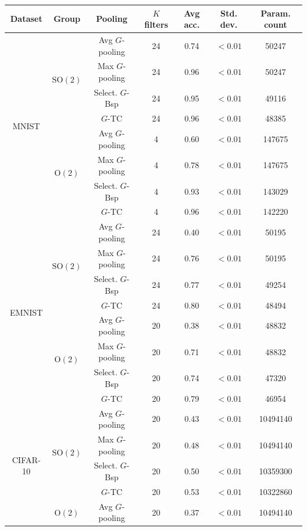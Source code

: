 \documentclass{article}
\theoremstyle{plain}
\theoremstyle{definition}
\theoremstyle{remark}
\begin{document}
\begin{table}[ht]
\centering
\begin{tabular}{||c|c|c|c|c|c|c||}
	\hline
	Dataset&Group&Pooling&$K$ filters&Avg acc.&Std. dev.&Param. count\\
 \hline
	\hline
	\multirow{8}{*}{MNIST}&\multirow{4}{*}{$\mathrm{SO}(2)$}&Avg $G$-pooling&24&0.74 &$<0.01$ &50247\\
	     &              &Max $G$-pooling&24& 0.96& $<0.01$ &50247\\
	     &              &Select. $G$-Bsp&24&0.95 &$<0.01$  &49116\\
	     &              &$G$-TC&24&0.96 &  $<0.01$&48385\\
        \cline{2-7}
	     &\multirow{4}{*}{$\mathrm{O}(2)$}&Avg $G$-pooling&4& 0.60&$<0.01$ &147675\\
	     &              &Max $G$-pooling&4&0.78 &  $<0.01$&147675\\
	     &              &Select. $G$-Bsp&4&0.93 & $<0.01$ &143029\\
	     &              &$G$-TC&4&0.96 &  $<0.01$&142220\\
	\hline
	\multirow{8}{*}{EMNIST}&\multirow{4}{*}{$\mathrm{SO}(2)$}&Avg $G$-pooling&24&0.40 &$<0.01$ &50195\\
	     &              &Max $G$-pooling&24& 0.76& $<0.01$ &50195\\
	     &              &Select. $G$-Bsp&24&0.77 & $<0.01$ &49254\\
	     &              &$G$-TC&24&0.80 &  $<0.01$&48494\\
	\cline{2-7}
	     &\multirow{4}{*}{$\mathrm{O}(2)$}&Avg $G$-pooling&20&0.38 &$<0.01$ &48832\\
	     &              &Max $G$-pooling&20&0.71 & $<0.01$ &48832\\
	     &              &Select. $G$-Bsp&20&0.74 & $<0.01$ &47320\\
	     &              &$G$-TC&20&0.79 & $<0.01$ &46954\\
	\hline
	\multirow{8}{*}{CIFAR-10}&\multirow{4}{*}{$\mathrm{SO}(2)$}&Avg $G$-pooling&20&0.43 &$<0.01$ &10494140\\
	     &              &Max $G$-pooling&20&0.48 & $<0.01$ &10494140\\
	     &              &Select. $G$-Bsp&20& 0.50& $<0.01$ &10359300\\
	     &              &$G$-TC&20&0.53 & $<0.01$ &10322860\\
	\cline{2-7}
	     &\multirow{4}{*}{$\mathrm{O}(2)$}&Avg $G$-pooling&20& 0.37&$<0.01$ &10494140\\

\end{tabular}
\end{table}
\end{document}
